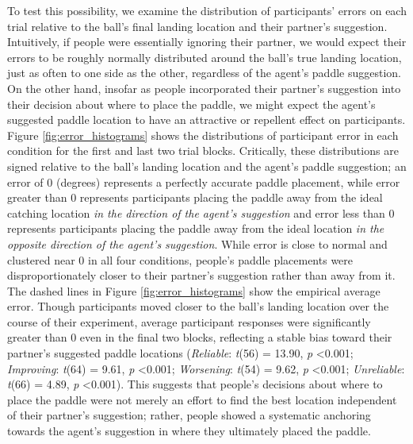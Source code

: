 \documentclass[10pt,letterpaper]{article}
\begin{document}
To test this possibility, we examine the distribution of participants' errors on each trial relative to the ball's final landing location and their partner's suggestion. Intuitively, if people were essentially ignoring their partner, we would expect their errors to be roughly normally distributed around the ball's true landing location, just as often to one side as the other, regardless of the agent's paddle suggestion. On the other hand, insofar as people incorporated their partner's suggestion into their decision about where to place the paddle, we might expect the agent's suggested paddle location to have an attractive or repellent effect on participants. Figure \ref{fig:error_histograms} shows the distributions of participant error in each condition for the first and last two trial blocks. Critically, these distributions are signed relative to the ball's landing location and the agent's paddle suggestion; an error of 0 (degrees) represents a perfectly accurate paddle placement, while error greater than 0 represents participants placing the paddle away from the ideal catching location \textit{in the direction of the agent's suggestion} and error less than 0 represents participants placing the paddle away from the ideal location \textit{in the opposite direction of the agent's suggestion}. While error is close to normal and clustered near 0 in all four conditions, people's paddle placements were disproportionately closer to their partner's suggestion rather than away from it. The dashed lines in Figure \ref{fig:error_histograms} show the empirical average error. Though participants moved closer to the ball's landing location over the course of their experiment, average participant responses were significantly greater than 0 even in the final two blocks, reflecting a stable bias toward their partner's suggested paddle locations (\textit{Reliable}: \textit{t}(56) = 13.90, \textit{p} \textless{0.001}; \textit{Improving}: \textit{t}(64) = 9.61, \textit{p} \textless{0.001}; \textit{Worsening}: \textit{t}(54) = 9.62, \textit{p} \textless{0.001}; \textit{Unreliable}: \textit{t}(66) = 4.89, \textit{p} \textless{0.001}). This suggests that people's decisions about where to place the paddle were not merely an effort to find the best location independent of their partner's suggestion; rather, people showed a systematic anchoring towards the agent's suggestion in where they ultimately placed the paddle.  
\end{document}
